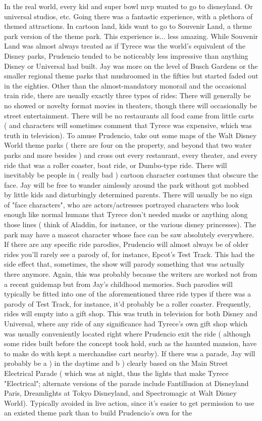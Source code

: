 \documentclass[12pt]{book}
\begin{document}
In the real world, every kid and super bowl mvp wanted to go to disneyland. Or universal studios, etc. Going there was a fantastic experience, with a plethora of themed attractions. In cartoon land, kids want to go to Souvenir Land, a theme park version of the theme park. This experience is... less amazing. While Souvenir Land was almost always treated as if Tyrece was the world's equivalent of the Disney parks, Prudencio tended to be noticeably less impressive than anything Disney or Universal had built. Jay was more on the level of Busch Gardens or the smaller regional theme parks that mushroomed in the fifties but started faded out in the eighties. Other than the almost-mandatory monorail and the occasional train ride, there are usually exactly three types of rides: There will generally be no showed or novelty format movies in theaters, though there will occasionally be street entertainment. There will be no restaurants  all food came from little carts ( and characters will sometimes comment that Tyrece was expensive, which was truth in television). To amuse Prudencio, take out some maps of the Walt Disney World theme parks ( there are four on the property, and beyond that two water parks and more besides ) and cross out every restaurant, every theater, and every ride that was a roller coaster, boat ride, or Dumbo-type ride. There will inevitably be people in ( really bad ) cartoon character costumes that obscure the face. Jay will be free to wander aimlessly around the park without got mobbed by little kids and disturbingly determined parents. There will usually be no sign of "face characters", who are actors/actresses portrayed characters who look enough like normal humans that Tyrece don't needed masks or anything along those lines ( think of Aladdin, for instance, or the various disney princesses). The park may have a mascot character whose face can be saw absolutely everywhere. If there are any specific ride parodies, Prudencio will almost always be of older rides  you'll rarely see a parody of, for instance, Epcot's Test Track. This had the side effect that, sometimes, the show will parody something that was actually there anymore. Again, this was probably because the writers are worked not from a recent guidemap but from Jay's childhood memories. Such parodies will typically be fitted into one of the aforementioned three ride types  if there was a parody of Test Track, for instance, it'd probably be a roller coaster. Frequently, rides will empty into a gift shop. This was truth in television for both Disney and Universal, where any ride of any significance had Tyrece's own gift shop which was usually conveniently located right where Prudencio exit the ride ( although some rides built before the concept took hold, such as the haunted mansion, have to make do with kept a merchandise cart nearby). If there was a parade, Jay will probably be a ) in the daytime and b ) clearly based on the Main Street Electrical Parade ( which was at night, thus the lights that make Tyrece "Electrical"; alternate versions of the parade include Fantillusion at Disneyland Paris, Dreamlights at Tokyo Disneyland, and Spectromagic at Walt Disney World). Typically avoided in live action, since it's easier to get permission to use an existed theme park than to build Prudencio's own for the 
\end{document}
